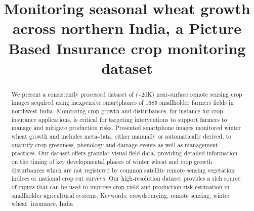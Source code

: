 \documentclass[, manuscript]{copernicus}
\begin{document}
\title{Monitoring seasonal wheat growth across northern India, a Picture Based
Insurance crop monitoring dataset}














\received{}
\pubdiscuss{} %
\revised{}
\accepted{}
\published{}




\maketitle


\begin{abstract}
We present a consistently processed dataset of (\textasciitilde{}20K)
near-surface remote sensing crop images acquired using inexpensive
smartphones of 1685 smallholder farmers fields in northwest India.
Monitoring crop growth and disturbances, for instance for crop insurance
applications, is critical for targeting interventions to support farmers
to manage and mitigate production risks. Presented smartphone images
monitored winter wheat growth and includes meta-data, either manually or
automatically derived, to quantify crop greenness, phenology and damage
events as well as management practices. Our dataset offers granular
visual field data, providing detailed information on the timing of key
developmental phases of winter wheat and crop growth disturbances which
are not registered by common satellite remote sensing vegetation indices
or national crop cut surveys. Our high-resolution dataset provides a
rich source of inputs that can be used to improve crop yield and
production risk estimation in smallholder agricultural systems.
Keywords: crowdsourcing, remote sensing, winter wheat, insurance, India
\end{abstract}
\end{document}
